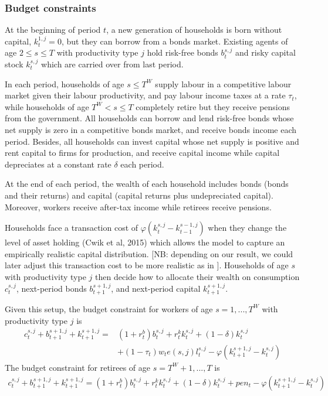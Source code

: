 \documentclass[12pt]{article}
\begin{document}
\subsubsection{Budget constraints}
At the beginning of period $t$, a new generation of households is born without capital, $k_t^{1,j}=0$, but they can borrow from a bonds market. Existing agents of age $2\leq s\leq T$ with productivity type $j$ hold risk-free bonds $b_{t}^{s,j}$ and risky capital stock $k_{t}^{s,j}$ which are carried over from last period. 

In each period, households of age $s\leq T^W$ supply labour in a competitive labour market given their labour productivity, and pay labour income taxes at a rate $\tau_t$, while households of age $T^W<s\leq T$ completely retire but they receive pensions from the government. All households can borrow and lend risk-free bonds whose net supply is zero in a competitive bonds market, and receive bonds income each period. Besides, all households can invest capital whose net supply is positive and rent capital to firms for production, and receive capital income while capital depreciates at a constant rate $\delta$ each period.  

At the end of each period, the wealth of each household includes bonds (bonds and their returns) and capital (capital returns plus undepreciated capital). Moreover, workers receive after-tax income while retirees receive pensions. 

Households face a transaction cost of $\varphi(k_{t}^{s,j}-k_{t-1}^{s-1,j})$ when they change the level of asset holding (Cwik et al, 2015) which allows the model to capture an empirically realistic capital distribution. [NB: depending on our result, we could later adjust this transaction cost to be more realistic as in \cite{fagereng2017asset} ]. Households of age $s$ with productivity type $j$ then decide how to allocate their wealth on consumption $c_{t}^{s,j}$, next-period bonds $b_{t+1}^{s+1,j}$, and next-period capital $k_{t+1}^{s+1,j}$. 

Given this setup, the budget constraint for workers of age $s=1,..., T^W$ with productivity type $j$ is
\begin{equation}
\begin{split} 
c_{t}^{s,j}+ b_{t+1}^{s+1,j} + k_{t+1}^{s+1,j}=&
(1+r_t^b)b_{t}^{s,j}+r_t^k k_{t}^{s,j}+(1-\delta)k_{t}^{s,j}\\
&+(1-\tau_t)w_te(s,j)l_{t}^{s,j}-\varphi(k_{t+1}^{s+1,j}-k_{t}^{s,j}) \label{eq:15}
\end{split}
\end{equation}
The budget constraint for retirees of age $s=T^W+1,...,T$ is 
\begin{equation}
\begin{split} 
c_{t}^{s,j}+ b_{t+1}^{s+1,j} + k_{t+1}^{s+1,j}=
(1+r_t^b)b_{t}^{s,j}
+r_t^k k_{t}^{s,j}+(1-\delta)k_{t}^{s,j}+pen_t-\varphi(k_{t+1}^{s+1,j}-k_{t}^{s,j}) \label{eq:16}
\end{split}
\end{equation}
\end{document}
